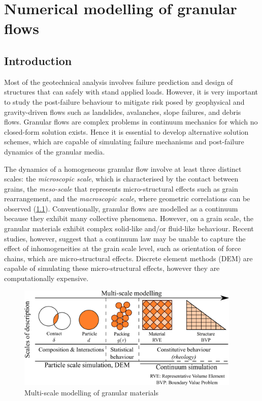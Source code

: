 \chapter{Numerical modelling of granular flows}

\ifpdf
    \graphicspath{{Chapter3/figs/raster/}{Chapter3/figs/pdf/}{Chapter3/figs/}}
\else
    \graphicspath{{Chapter3/figs/vector/}{Chapter3/figs/}}
\fi
\label{chapter:numerical_modelling}
\section{Introduction}

Most of the geotechnical analysis involves failure prediction and design of 
structures that can safely with stand applied loads. However, it is very 
important to study the post-failure behaviour to mitigate risk posed by 
geophysical and gravity-driven flows such as landslides, avalanches, slope 
failures, and debris flows. Granular flows are complex problems in continuum 
mechanics for which no closed-form solution exists. Hence it is essential to 
develop alternative solution schemes, which are capable of simulating failure 
mechanisms and post-failure dynamics of the granular media. 

The dynamics of a homogeneous granular flow involve at least three distinct 
scales: the \textit{microscopic scale}, which is characterised by the contact 
between grains, the \textit{meso-scale} that represents micro-structural 
effects such as grain rearrangement, and the \textit{macroscopic scale}, where 
geometric correlations can be observed (\cref{fig:multiscale}). Conventionally, 
granular flows are modelled as a continuum because they exhibit many collective 
phenomena. However, on a grain scale, the granular materials exhibit complex 
solid-like and/or fluid-like behaviour. Recent studies, however, suggest that a 
continuum law may be unable to capture the effect of inhomogeneities at the 
grain scale level, such as orientation of force chains, which are 
micro-structural effects. Discrete element methods (DEM) are capable of 
simulating these micro-structural effects, however they are computationally 
expensive. 

\begin{figure}[tbhp]
\centering
\includegraphics[width=0.95\textwidth]{multiscale}
\caption{Multi-scale modelling of granular materials}
\label{fig:multiscale}
\end{figure}


